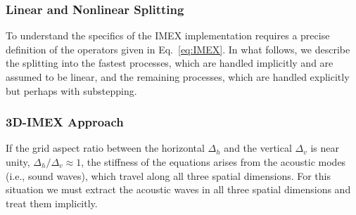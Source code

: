 \documentclass{article}
\begin{document}
\subsubsection{Linear and Nonlinear Splitting}
 To understand the specifics of the IMEX implementation requires a precise definition of the operators given in Eq.\ \eqref{eq:IMEX}. In what follows, we describe the splitting into the fastest processes, which are handled implicitly and are assumed to be linear, and the remaining processes, which are handled explicitly but perhaps with substepping. 
 
 \subsubsection{3D-IMEX Approach}
 \label{sec:3D-IMEX/v1}
If the grid aspect ratio between the horizontal $\Delta_h$ and the vertical $\Delta_v$ is near unity, $\Delta_h/\Delta_v \approx 1$, the stiffness of the equations arises from the acoustic modes (i.e., sound waves), which travel along all three spatial dimensions. For this situation we must extract the acoustic waves in all three spatial dimensions and treat them implicitly.  
\end{document}
